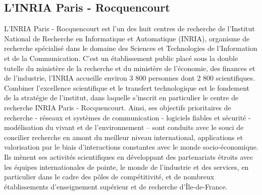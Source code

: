 	\subsection{L'INRIA Paris - Rocquencourt}
	L’INRIA Paris - Rocquencourt est l'un des huit centres de recherche de l’Institut National de Recherche en Informatique et Automatique (INRIA), organisme de recherche spécialisé dans le domaine des Sciences et Technologies de l’Information et de la Communication. C'est un établissement public placé sous la double tutelle du ministère de la recherche et du ministère de l’économie, des finances et de l’industrie, l'INRIA accueille environ 3 800 personnes dont 2 800 scientifiques. \\
	Combiner l’excellence scientifique et le transfert technologique est le fondement de la stratégie de l’institut, dans laquelle s’inscrit en particulier le centre de recherche INRIA Paris - Rocquencourt. Ainsi, ses objectifs prioritaires de recherche - réseaux et systèmes de communication - logiciels fiables et sécurité - modélisation du vivant et de l'environnement – sont conduits avec le souci de concilier recherche en amont du meilleur niveau international, applications et valorisation par le biais d’interactions constantes avec le monde socio-économique.\\
	Ils mènent ses activités scientifiques en développant des partenariats étroits avec les équipes internationales de pointe, le monde de l’industrie et des services, en particulier dans le cadre des pôles de compétitivité, et de nombreux établissements d’enseignement supérieur et de recherche d’Île-de-France.
	
